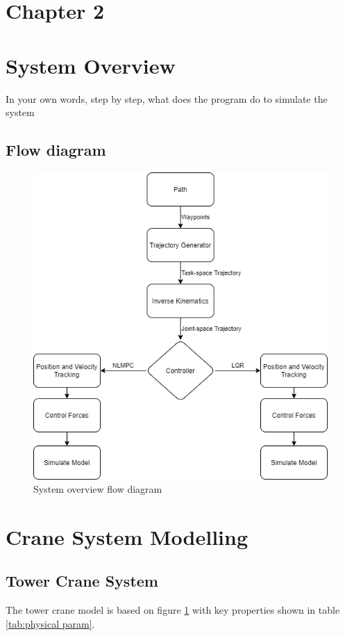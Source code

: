 \documentclass{UoNMCHA}
\numberwithin{equation}{section}
\begin{document}
	\newpage
	\section*{Chapter 2}
	\section{System Overview}
	In your own words, step by step, what does the program do to simulate the system
	
	\subsection{Flow diagram}
	
	\begin{figure}[H]
		\begin{center}
			\includegraphics[width=.8\linewidth]{figs/Picture4}
			\caption{System overview flow diagram}
			\label{figs/Picture4}
		\end{center}
	\end{figure}
	
	\newpage
	\section{Crane System Modelling}
	
	\subsection{Tower Crane System}
	The tower crane model is based on figure \ref{figs/Picture4} with key properties shown in table \ref{tab:physical param}.
	
\end{document}
